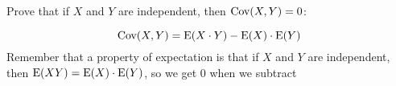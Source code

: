\question Prove that if $X$ and $Y$ are independent, then $\text{Cov}(X, Y) = 0$:
\begin{solution}[2cm]
	\[\text{Cov}(X, Y) = \text{E}(X \cdot Y) - \text{E}(X) \cdot \text{E}(Y)\]
Remember that a property of expectation is that if $X$ and $Y$ are 
independent, then $\text{E}(XY) = \text{E}(X) \cdot \text{E}(Y)$, so we get 0 when we subtract
\end{solution}
